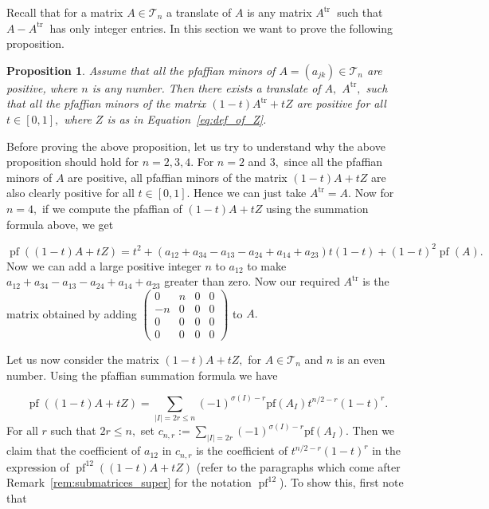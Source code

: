 \documentclass[9pt, BCOR=2mm]{amsart}
\numberwithin{equation}{section}
\numberwithin{equation}{section}
\newtheorem{proposition}[theorem]{Proposition}
\newcommand{\pf}{{\operatorname{pf}}}
\begin{document}
Recall that for a matrix $A \in \mathcal{T}_n$ a translate of $A$ is any matrix $A^{\text {tr }}$ such that $A-A^{\text {tr }}$ has only integer entries. In this section we want to prove the following proposition. 

\begin{proposition}\label{prp:translate}
Assume that all the pfaffian minors of $A =(a_{jk})\in \mathcal{T}_n$ are positive, where $n$ is any number. Then there exists a translate of $A,$ $A^{\mathrm{tr}},$ such that all the pfaffian minors of the matrix $(1-t)A^{\mathrm{tr}}+tZ$  are positive for all $t\in [0,1],$ where $Z$ is as in Equation~\ref{eq:def_of_Z}. 
\end{proposition}




Before proving the above proposition, let us try to understand why the above proposition should hold for $n=2, 3, 4.$ For $n=2$ and $3,$ since all the pfaffian minors of $A$ are positive, all pfaffian minors of the matrix $(1-t)A+tZ$  are also clearly positive for all $t\in [0,1]$. Hence we can just take $A^{\mathrm{tr}}=A.$ Now for $n=4,$ if we compute the pfaffian of $(1-t)A+tZ$ using the summation formula above, we get  

\begin{equation}\label{eq:sumofpaff_t_4}
	\operatorname{pf}((1-t)A+tZ)=t^2+(a_{12}+a_{34}-a_{13}-a_{24}+a_{14}+a_{23})t(1-t)+(1-t)^2\pf(A).
\end{equation}
Now we can add a large positive integer $n$ to $a_{12}$ to make $a_{12}+a_{34}-a_{13}-a_{24}+a_{14}+a_{23}$ greater than zero. Now our required $A^{\mathrm{tr}}$ is the matrix obtained by adding $\left(\begin{array}{cccc}0 & n & 0 & 0 \\ -n & 0 & 0 & 0 \\ 0 & 0 & 0 & 0 \\ 0 & 0 & 0 & 0\end{array}\right)$ to $A.$


Let us now consider the matrix $(1-t)A+tZ,$ for $A \in \mathcal{T}_n$ and $n$ is an even number.  Using the pfaffian summation formula we have

\begin{equation}\label{eq:sumofpaff_t}
	\operatorname{pf}((1-t)A+tZ)=\sum_{|I|=2r\le n}(-1)^{\sigma(I)-r} \mathrm{pf}(A_{I}) t^{n/2-r}(1-t)^r.
\end{equation}
 For all $r$ such that $2r\le n,$ set $c_{n,r}:=\sum_{|I|=2r}(-1)^{\sigma(I)-r} \mathrm{pf}(A_{I}).$   Then we claim that the coefficient of $a_{12}$ in $c_{n,r}$ is the coefficient of $t^{n/2-r}(1-t)^r$ in the expression of $\operatorname{pf}^{12}((1-t)A+tZ)$ (refer to the paragraphs which come after Remark~\ref{rem:submatrices_super} for the notation $\operatorname{pf}^{12}$). To show this, first note that 
\end{document}
